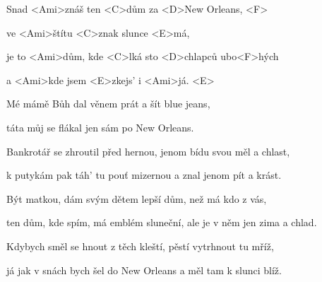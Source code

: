 

\zs
Snad <Ami>znáš ten <C>dům za <D>New Orleans, <F>

ve <Ami>štítu <C>znak slunce <E>má,

je to <Ami>dům, kde <C>lká sto <D>chlapců ubo<F>hých

a <Ami>kde jsem <E>zkejs' i <Ami>já. <E>
\ks

\zs
Mé mámě Bůh dal věnem prát a šít blue jeans,

táta můj se flákal jen sám po New Orleans.
\ks

\zs
Bankrotář se zhroutil před hernou, jenom bídu svou měl a chlast,

k putykám pak táh' tu pouť mizernou a znal jenom pít a krást.
\ks

\zs
Být matkou, dám svým dětem lepší dům, než má kdo z vás,

ten dům, kde spím, má emblém sluneční, ale je v něm jen zima a chlad.
\ks

\zs
Kdybych směl se hnout z těch kleští, pěstí vytrhnout tu mříž,

já jak v snách bych šel do New Orleans a měl tam k slunci blíž.
\ks

\kp
